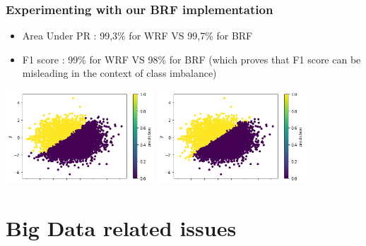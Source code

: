 \documentclass[slidestop,compress,red,mathserif]{beamer}
\begin{document}
\begin{frame}
\frametitle{Experimenting with our BRF implementation}
\begin{itemize}
  \item Area Under PR : 99,3\% for WRF VS 99,7\% for BRF
  \item F1 score : 99\% for WRF VS 98\% for BRF (which proves that F1 score can be misleading in the context of class imbalance)

\end{itemize}

\centering
\includegraphics[height=3.5cm, keepaspectratio]{Figures/BRF.png}
\includegraphics[height=3.5cm, keepaspectratio]{Figures/WRF.png}

\end{frame}

\section{Big Data related issues}
\end{document}
